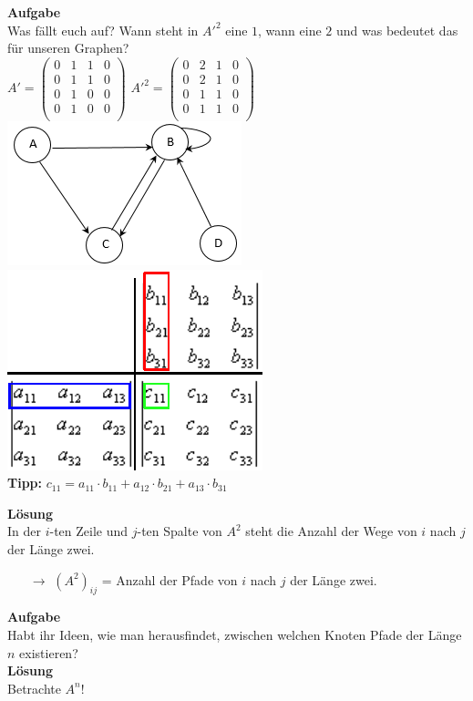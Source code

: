 \begin{frame}
	\textbf{Aufgabe}\\
	Was fällt euch auf? Wann steht in $A'^2$ eine $1$, wann eine $2$ und was bedeutet das für unseren Graphen?\\
	$ A' =
	\begin{pmatrix}
	0&1&1&0\\
	0&1&1&0\\
	0&1&0&0\\
	0&1&0&0\\
	\end{pmatrix}	
	$ 
	$ A'^2 =
	\begin{pmatrix}
	0&2&1&0\\
	0&2&1&0\\
	0&1&1&0\\
	0&1&1&0\\
	\end{pmatrix}	
	$ 
	\pause
	\includegraphics[scale=0.6]{images/Graph2.png} \hspace{0.3cm}\pause
	\includegraphics[scale=0.5]{images/multiplikation.png}\\
	\textbf{Tipp:} $c_{11} = a_{11} \cdot b_{11} + a_{12} \cdot b_{21} + a_{13} \cdot b_{31}$
\end{frame}

\begin{frame}
	\textbf{Lösung}\\
	In der $i$-ten Zeile und $j$-ten Spalte von $A^2$ steht die Anzahl der Wege von $i$ nach $j$ der Länge zwei.\\
	\begin{itemize}
		\item[$\rightarrow$]$(A^2)_{ij}$ = Anzahl der Pfade von $i$ nach $j$ der Länge zwei.
	\end{itemize}

	\pause

	\textbf{Aufgabe}\\
	Habt ihr Ideen, wie man herausfindet, zwischen welchen Knoten Pfade der Länge $n$ existieren?\\
	\pause
	\textbf{Lösung}\\
	Betrachte $A^n$!
\end{frame}

